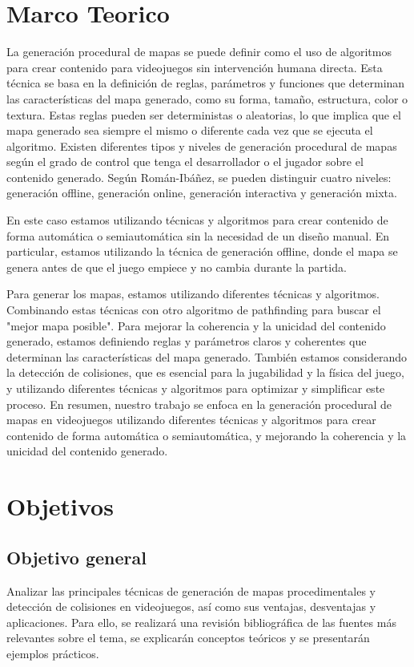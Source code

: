 \documentclass[stu, 12pt, letterpaper, donotrepeattitle, floatsintext, natbib]{apa7}
\begin{document}
\section{\large Marco Teorico}
\noindent {}
La generación procedural de mapas se puede definir como el uso de algoritmos para crear contenido para videojuegos sin intervención humana directa. Esta técnica se basa en la definición de reglas, parámetros y funciones que determinan las características del mapa generado, como su forma, tamaño, estructura, color o textura. Estas reglas pueden ser deterministas o aleatorias, lo que implica que el mapa generado sea siempre el mismo o diferente cada vez que se ejecuta el algoritmo. Existen diferentes tipos y niveles de generación procedural de mapas según el grado de control que tenga el desarrollador o el jugador sobre el contenido generado. Según Román-Ibáñez, se pueden distinguir cuatro niveles: generación offline, generación online, generación interactiva y generación mixta.

En este caso estamos utilizando técnicas y algoritmos para crear contenido de forma automática o semiautomática sin la necesidad de un diseño manual. En particular, estamos utilizando la técnica de generación offline, donde el mapa se genera antes de que el juego empiece y no cambia durante la partida.

Para generar los mapas, estamos utilizando diferentes técnicas y algoritmos. Combinando estas técnicas con otro algoritmo de pathfinding para buscar el "mejor mapa posible". Para mejorar la coherencia y la unicidad del contenido generado, estamos definiendo reglas y parámetros claros y coherentes que determinan las características del mapa generado. También estamos considerando la detección de colisiones, que es esencial para la jugabilidad y la física del juego, y utilizando diferentes técnicas y algoritmos para optimizar y simplificar este proceso. En resumen, nuestro trabajo se enfoca en la generación procedural de mapas en videojuegos utilizando diferentes técnicas y algoritmos para crear contenido de forma automática o semiautomática, y mejorando la coherencia y la unicidad del contenido generado.

\section{\large Objetivos}
\subsection{Objetivo general} 
Analizar las principales técnicas de generación de mapas procedimentales y detección de colisiones en videojuegos, así como sus ventajas, desventajas y aplicaciones. Para ello, se realizará una revisión bibliográfica de las fuentes más relevantes sobre el tema, se explicarán conceptos teóricos y se presentarán ejemplos prácticos.
\end{document}
